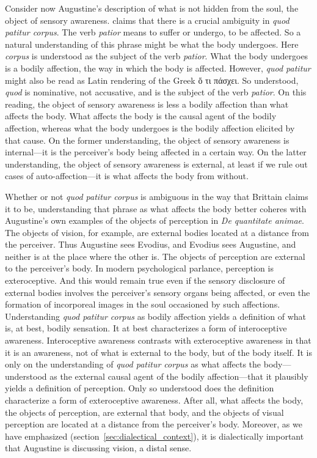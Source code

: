 \documentclass[12pt]{article}
\begin{document}
Consider now Augustine's description of what is not hidden from the soul, the object of sensory awareness. \citet[274--278]{Brittain:2002hl} claims that there is a crucial ambiguity in \emph{quod patitur corpus}. The verb \emph{patior} means to suffer or undergo, to be affected. So a natural understanding of this phrase might be what the body undergoes. Here \emph{corpus} is understood as the subject of the verb \emph{patior}. What the body undergoes is a bodily affection, the way in which the body is affected. However, \emph{quod patitur} might also be read as Latin rendering of the Greek {\sbl ὅ τι πάσχει}. So understood, \emph{quod} is nominative, not accusative, and is the subject of the verb \emph{patior}. On this reading, the object of sensory awareness is less a bodily affection than what affects the body. What affects the body is the causal agent of the bodily affection, whereas what the body undergoes is the bodily affection elicited by that cause. On the former understanding, the object of sensory awareness is internal---it is the perceiver's body being affected in a certain way. On the latter understanding, the object of sensory awareness is external, at least if we rule out cases of auto-affection---it is what affects the body from without. 

Whether or not \emph{quod patitur corpus} is ambiguous in the way that Brittain claims it to be, understanding that phrase as what affects the body better coheres with Augustine's own examples of the objects of perception in \emph{De quantitate animae}. The objects of vision, for example, are external bodies located at a distance from the perceiver. Thus Augustine sees Evodius, and Evodius sees Augustine, and neither is at the place where the other is. The objects of perception are external to the perceiver's body. In modern psychological parlance, perception is exteroceptive. And this would remain true even if the sensory disclosure of external bodies involves the perceiver's sensory organs being affected, or even the formation of incorporeal images in the soul occasioned by such affections. Understanding \emph{quod patitur corpus} as bodily affection yields a definition of what is, at best, bodily sensation. It at best characterizes a form of interoceptive awareness. Interoceptive awareness contrasts with exteroceptive awareness in that it is an awareness, not of what is external to the body, but of the body itself. It is only on the understanding of \emph{quod patitur corpus} as what affects the body---understood as the external causal agent of the bodily affection---that it plausibly yields a definition of perception. Only so understood does the definition characterize a form of exteroceptive awareness. After all, what affects the body, the objects of perception, are external that body, and the objects of visual perception are located at a distance from the perceiver's body.  Moreover, as we have emphasized (section~\ref{sec:dialectical_context}), it is dialectically important that Augustine is discussing vision, a distal sense.
\end{document}
